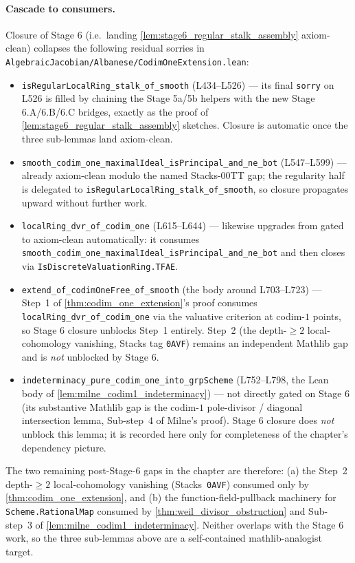 \paragraph{Cascade to consumers.} Closure of Stage 6 (i.e.\ landing
\cref{lem:stage6_regular_stalk_assembly} axiom-clean) collapses the
following residual sorries in
\texttt{AlgebraicJacobian/Albanese/CodimOneExtension.lean}:
\begin{itemize}
  \item \texttt{isRegularLocalRing\_stalk\_of\_smooth} (L434--L526) ---
    its final \texttt{sorry} on L526 is filled by chaining the Stage 5a/5b
    helpers with the new Stage 6.A/6.B/6.C bridges, exactly as the
    proof of \cref{lem:stage6_regular_stalk_assembly} sketches. Closure
    is automatic once the three sub-lemmas land axiom-clean.
  \item \texttt{smooth\_codim\_one\_maximalIdeal\_isPrincipal\_and\_ne\_bot}
    (L547--L599) --- already axiom-clean modulo the named Stacks-00TT
    gap; the regularity half is delegated to
    \texttt{isRegularLocalRing\_stalk\_of\_smooth}, so closure
    propagates upward without further work.
  \item \texttt{localRing\_dvr\_of\_codim\_one} (L615--L644) ---
    likewise upgrades from gated to axiom-clean automatically: it
    consumes \texttt{smooth\_codim\_one\_maximalIdeal\_isPrincipal\_and\_ne\_bot}
    and then closes via \texttt{IsDiscreteValuationRing.TFAE}.
  \item \texttt{extend\_of\_codimOneFree\_of\_smooth} (the body
    around L703--L723) --- Step~1 of
    \cref{thm:codim_one_extension}'s proof consumes
    \texttt{localRing\_dvr\_of\_codim\_one} via the valuative
    criterion at codim-\(1\) points, so Stage 6 closure unblocks
    Step~1 entirely. Step~2 (the depth-\(\geq 2\) local-cohomology
    vanishing, Stacks tag \texttt{0AVF}) remains an independent
    Mathlib gap and is \emph{not} unblocked by Stage 6.
  \item \texttt{indeterminacy\_pure\_codim\_one\_into\_grpScheme}
    (L752--L798, the Lean body of
    \cref{lem:milne_codim1_indeterminacy}) --- not directly gated on
    Stage 6 (its substantive Mathlib gap is the codim-\(1\)
    pole-divisor / diagonal intersection lemma, Sub-step~4 of
    Milne's proof). Stage 6 closure does \emph{not} unblock this
    lemma; it is recorded here only for completeness of the
    chapter's dependency picture.
\end{itemize}

The two remaining post-Stage-6 gaps in the chapter are therefore:
(a) the Step~2 depth-\(\geq 2\) local-cohomology vanishing
(Stacks~\texttt{0AVF}) consumed only by
\cref{thm:codim_one_extension}, and (b) the
function-field-pullback machinery for \texttt{Scheme.RationalMap}
consumed by \cref{thm:weil_divisor_obstruction} and Sub-step~3 of
\cref{lem:milne_codim1_indeterminacy}. Neither overlaps with the
Stage 6 work, so the three sub-lemmas above are a self-contained
mathlib-analogist target.

